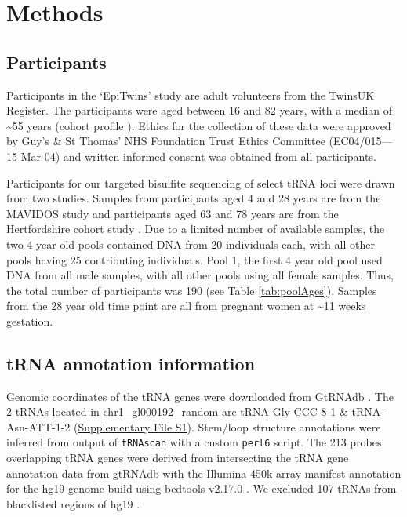 \documentclass[]{book}
\begin{document}
\newpage

\hypertarget{Methods}{%
\section{Methods}\label{Methods}}

\hypertarget{participants}{%
\subsection{Participants}\label{participants}}

Participants in the `EpiTwins' study are adult volunteers from the TwinsUK Register.
The participants were aged between 16 and 82 years, with a median of \textasciitilde55 years (cohort profile \citep{Moayyeri2013}).
Ethics for the collection of these data were approved by Guy's \& St Thomas' NHS Foundation Trust Ethics Committee (EC04/015---15-Mar-04) and written informed consent was obtained from all participants.

Participants for our targeted bisulfite sequencing of select tRNA loci were drawn from two studies.
Samples from participants aged 4 and 28 years are from the MAVIDOS \citep{Harvey2012a} study and participants aged 63 and 78 years are from the Hertfordshire cohort study \citep{Syddall2005}.
Due to a limited number of available samples, the two 4 year old pools contained DNA from 20 individuals each, with all other pools having 25 contributing individuals.
Pool 1, the first 4 year old pool used DNA from all male samples, with all other pools using all female samples.
Thus, the total number of participants was 190 (see Table \ref{tab:poolAges}).
Samples from the 28 year old time point are all from pregnant women at \textasciitilde11 weeks gestation.

\hypertarget{tRNAanno}{%
\subsection{tRNA annotation information}\label{tRNAanno}}

Genomic coordinates of the tRNA genes were downloaded from GtRNAdb \citep{Chan2009}.
The 2 tRNAs located in chr1\_gl000192\_random are tRNA-Gly-CCC-8-1 \& tRNA-Asn-ATT-1-2 (\href{./Supplementary_Files/hg19-tRNAs.bed}{Supplementary File S1}).
Stem/loop structure annotations were inferred from output of \texttt{tRNAscan} \citep{Lowe2016} with a custom \texttt{perl6} script.
The 213 probes overlapping tRNA genes were derived from intersecting the tRNA gene annotation data from gtRNAdb with the Illumina 450k array manifest annotation for the hg19 genome build using bedtools v2.17.0 \citep{Quinlan2010}.
We excluded 107 tRNAs from blacklisted regions of hg19 \citep{Amemiya2019}.
\end{document}
